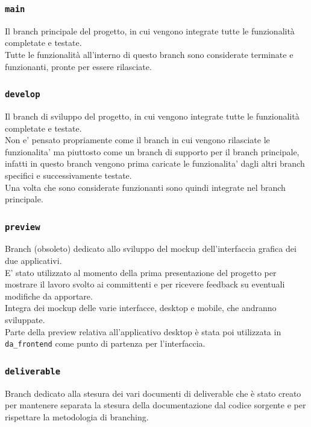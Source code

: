 \documentclass{article}
\begin{document}
\subsubsection{\texttt{main}}

Il branch principale del progetto, in cui vengono integrate tutte le funzionalità completate e testate.\\
Tutte le funzionalità all'interno di questo branch sono considerate terminate e funzionanti, pronte per essere rilasciate.

\subsubsection{\texttt{develop}}

Il branch di sviluppo del progetto, in cui vengono integrate tutte le funzionalità completate e testate.\\
Non e' pensato propriamente come il branch in cui vengono rilasciate le funzionalita' ma piuttosto come un branch di supporto per il branch principale, infatti in questo branch vengono prima caricate le funzionalita' dagli altri branch specifici e successivamente testate.\\
Una volta che sono considerate funzionanti sono quindi integrate nel branch principale.

\subsubsection{\texttt{preview}}

Branch (obsoleto) dedicato allo sviluppo del mockup dell'interfaccia grafica dei due applicativi.\\
E' stato utilizzato al momento della prima presentazione del progetto per mostrare il lavoro svolto ai committenti e per ricevere feedback su eventuali modifiche da apportare.\\
Integra dei mockup delle varie interfacce, desktop e mobile, che andranno sviluppate.\\
Parte della preview relativa all'applicativo desktop è stata poi utilizzata in \texttt{da\_frontend} come punto di partenza per l'interfaccia.

\subsubsection{\texttt{deliverable}}

Branch dedicato alla stesura dei vari documenti di deliverable che è stato creato per mantenere separata la stesura della documentazione dal codice sorgente e per rispettare la metodologia di branching.
\end{document}
